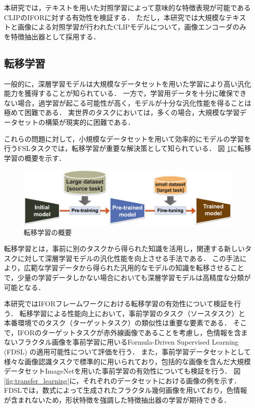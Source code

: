 本研究では，テキストを用いた対照学習によって意味的な特徴表現が可能であるCLIPのIFORに対する有効性を検証する．
ただし，本研究では大規模なテキストと画像による対照学習が行われたCLIPモデルについて，画像エンコーダのみを特徴抽出器として採用する．

\subsection{転移学習}

一般的に，深層学習モデルは大規模なデータセットを用いた学習により高い汎化能力を獲得することが知られている．
一方で，学習用データを十分に確保できない場合，過学習が起こる可能性が高く，モデルが十分な汎化性能を得ることは極めて困難である．
実世界のタスクにおいては，多くの場合，大規模な学習データセットの構築が現実的に困難である．

これらの問題に対して，小規模なデータセットを用いて効率的にモデルの学習を行うFSLタスクでは，転移学習が重要な解決策として知られている．
図 \ref{fig:transfer_image}に転移学習の概要を示す．
% 
\begin{figure}[tbp]
  \centering
  \includegraphics[width=\linewidth, keepaspectratio]{image/transfer_learning.png}
  \caption{転移学習の概要}
  \label{fig:transfer_image}
\end{figure}
% 
転移学習とは，事前に別のタスクから得られた知識を活用し，関連する新しいタスクに対して深層学習モデルの汎化性能を向上させる手法である．
この手法により，広範な学習データから得られた汎用的なモデルの知識を転移させることで，少量の学習データしかない場合においても深層学習モデルは高精度な分類が可能となる．

本研究ではIFORフレームワークにおける転移学習の有効性について検証を行う．
転移学習による性能向上において，事前学習のタスク（ソースタスク）と本番環境でのタスク（ターゲットタスク）の類似性は重要な要素である．
そこで，IFORのターゲットタスクが赤外線画像であることを考慮し，色情報を含まないフラクタル画像を事前学習に用いるFormula-Driven Supervised Learning (FDSL) \cite{fdsl}の適用可能性について評価を行う．
また，事前学習データセットとして様々な画像認識タスクで標準的に用いられており，包括的な画像を含んだ大規模データセットImageNetを用いた事前学習の有効性についても検証を行う．
図 \ref{fig:transfer_learning}に，それぞれのデータセットにおける画像の例を示す．
FDSLでは，数式によって生成されたフラクタル幾何画像を用いており，色情報が含まれないため，形状特徴を強調した特徴抽出器の学習が期待できる．

